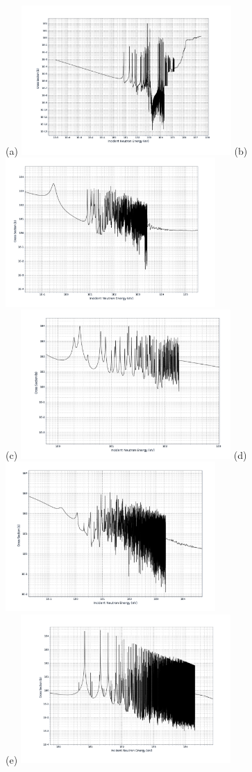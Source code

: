 \documentclass{report}
\begin{document}
(a) \includegraphics[width=8cm]{u238_fission.png}
(b) \includegraphics[width=8cm]{pu239_fission.png} \\
(c) \includegraphics[width=8cm]{gd155_absorption.png}
(d) \includegraphics[width=8cm]{u235_fission.png}\\
(e) \includegraphics[width=8cm]{u238_absorption.png}
\end{document}
